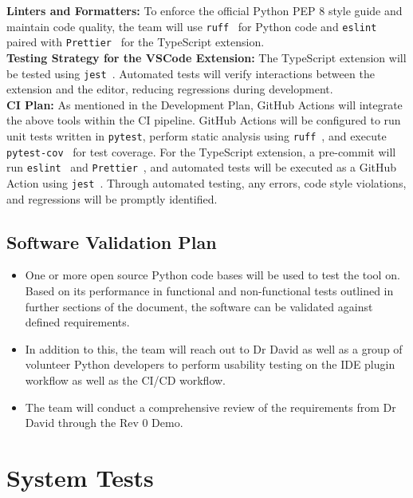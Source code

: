 \documentclass[12pt, titlepage]{article}
\begin{document}
\noindent\textbf{Linters and Formatters:} To enforce the official
Python PEP 8 style guide and maintain code quality, the team will use
\texttt{ruff}~\cite{ruff} for Python code and
\texttt{eslint}~\cite{eslint} paired with
\texttt{Prettier}~\cite{prettier} for the TypeScript extension.\\

\noindent\textbf{Testing Strategy for the VSCode Extension:} The
TypeScript extension will be tested using \texttt{jest}~\cite{jest}.
Automated tests will verify interactions between the extension and
the editor, reducing regressions during development.\\

\noindent\textbf{CI Plan:} As mentioned in the Development Plan,
GitHub Actions will integrate the above tools within the CI pipeline.
GitHub Actions will be configured to run unit tests written in
\texttt{pytest}, perform static analysis using
\texttt{ruff}~\cite{ruff}, and execute
\texttt{pytest-cov}~\cite{pytest-cov} for test coverage. For the
TypeScript extension, a pre-commit will run
\texttt{eslint}~\cite{eslint} and \texttt{Prettier}~\cite{prettier},
and automated tests will be executed as a GitHub Action using
\texttt{jest}~\cite{jest}. Through automated testing, any errors,
code style violations, and regressions will be promptly identified.\\

\subsection{Software Validation Plan}

\begin{itemize}
  \item One or more open source Python code bases will be used to
    test the tool on. Based on its performance in functional and
    non-functional tests outlined in further sections of the
    document, the software can be validated against defined requirements.
  \item In addition to this, the team will reach out to Dr David as
    well as a group of volunteer Python developers to perform
    usability testing on the IDE plugin workflow as well as the CI/CD workflow.
  \item The team will conduct a comprehensive review of the
    requirements from Dr David through the Rev 0 Demo.
\end{itemize}

\section{System Tests}
\end{document}
